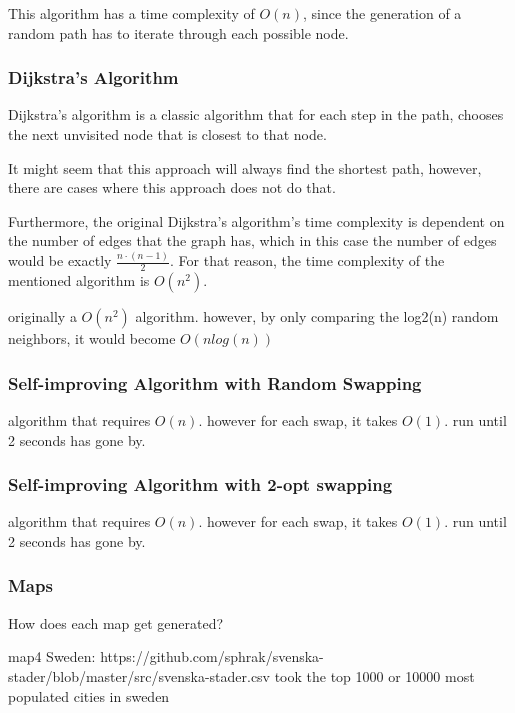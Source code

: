 \documentclass{article}
\begin{document}
\noindent
This algorithm has a time complexity of $O(n)$, since the generation of a random path has to iterate through each possible node. 

\subsubsection{Dijkstra's Algorithm}\label{Dijkstras}
Dijkstra's algorithm is a classic algorithm that for each step in the path, chooses the next unvisited node that is closest to that node. 



It might seem that this approach will always find the shortest path, however, there are cases where this approach does not do that. 


Furthermore, the original Dijkstra's algorithm's time complexity is dependent on the number of edges that the graph has, which in this case the number of edges would be exactly $\frac{n \cdot (n-1)}{2}$. For that reason, the time complexity of the mentioned algorithm is $O(n^2)$.



originally a $O(n^2)$ algorithm. however, by only comparing the log2(n) random neighbors, it would become $O(nlog(n))$

\subsubsection{Self-improving Algorithm with Random Swapping}\label{Random Swapping}
algorithm that requires $O(n)$. however for each swap, it takes $O(1)$. run until 2 seconds has gone by.

\subsubsection{Self-improving Algorithm with 2-opt swapping}\label{2-opt swapping}
algorithm that requires $O(n)$. however for each swap, it takes $O(1)$. run until 2 seconds has gone by.

\subsubsection{Maps}\label{maps}
How does each map get generated?

map4 Sweden: https://github.com/sphrak/svenska-stader/blob/master/src/svenska-stader.csv  took the top 1000 or 10000 most populated cities in sweden
\end{document}
